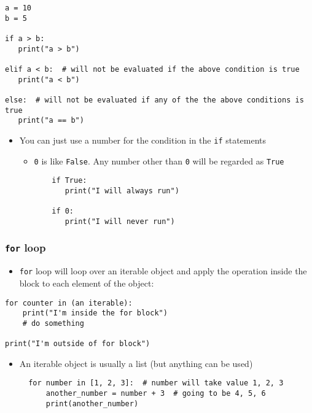 \documentclass[10pt,article]{article}
\begin{document}
\begin{verbatim}
a = 10
b = 5

if a > b:
   print("a > b")

elif a < b:  # will not be evaluated if the above condition is true
   print("a < b")

else:  # will not be evaluated if any of the the above conditions is true
   print("a == b")
\end{verbatim}

\begin{itemize}
\item You can just use a number for the condition in the \texttt{if} statements

\begin{itemize}
\item \texttt{0} is like \texttt{False}. Any number other than \texttt{0} will be regarded as \texttt{True}

\begin{verbatim}
    if True:
       print("I will always run")
    
    if 0:
       print("I will never run")
\end{verbatim}
\end{itemize}
\end{itemize}
\subsubsection{\texttt{for} loop}
\label{sec:org1fb886a}
\begin{itemize}
\item \texttt{for} loop will loop over an iterable object and apply the operation inside the block 
to each element of the object:
\end{itemize}

\begin{verbatim}
for counter in (an iterable):
    print("I'm inside the for block")
    # do something

print("I'm outside of for block")
\end{verbatim}

\begin{itemize}
\item An iterable object is usually a list (but anything can be used)
\begin{verbatim}
  for number in [1, 2, 3]:  # number will take value 1, 2, 3
      another_number = number + 3  # going to be 4, 5, 6
      print(another_number)
\end{verbatim}
\end{itemize}
\end{document}

